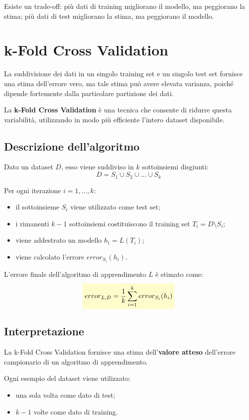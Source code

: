 \documentclass[a4paper,12pt]{report}
\newcommand{\highlight}[1]{%
\colorbox{yellow!20}{$\displaystyle #1$}%
}
\begin{document}
Esiste un trade-off:
più dati di training migliorano il modello, ma peggiorano la stima;
più dati di test migliorano la stima, ma peggiorano il modello.


\section{k-Fold Cross Validation}

La suddivisione dei dati in un singolo training set e un singolo test set fornisce una stima dell’errore vero, ma tale stima può avere elevata varianza, poiché dipende fortemente dalla particolare partizione dei dati.

La \textbf{k-Fold Cross Validation} è una tecnica che consente di ridurre questa variabilità, utilizzando in modo più efficiente l’intero dataset disponibile.

\subsection{Descrizione dell’algoritmo}

Dato un dataset \( D \), esso viene suddiviso in \( k \) sottoinsiemi disgiunti:
\[
D = S_1 \cup S_2 \cup \dots \cup S_k
\]

Per ogni iterazione \( i = 1, \dots, k \):
\begin{itemize}
    \item il sottoinsieme \( S_i \) viene utilizzato come test set;
    \item i rimanenti \( k-1 \) sottoinsiemi costituiscono il training set \( T_i = D \setminus S_i \);
    \item viene addestrato un modello \( h_i = L(T_i) \);
    \item viene calcolato l’errore \( error_{S_i}(h_i) \).
\end{itemize}

L’errore finale dell’algoritmo di apprendimento \( L \) è stimato come:
\[
\highlight{
error_{L,D} = \frac{1}{k} \sum_{i=1}^{k} error_{S_i}(h_i)
}
\]

\subsection*{Interpretazione}

La k-Fold Cross Validation fornisce una stima dell’\textbf{valore atteso} dell’errore campionario di un algoritmo di apprendimento.

Ogni esempio del dataset viene utilizzato:
\begin{itemize}
    \item una sola volta come dato di test;
    \item \( k-1 \) volte come dato di training.
\end{itemize}
\end{document}
